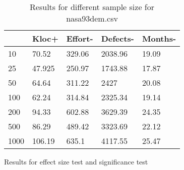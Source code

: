 \begin{table}[]
  \begin{center}
  \begin{tabular}{lllll}
       & Kloc+  & Effort- & Defects- & Months- \\
  \hline
  10   & 70.52  & 329.06  & 2038.96  & 19.09   \\
  25   & 47.925 & 250.97  & 1743.88  & 17.87   \\
  50   & 64.64  & 311.22  & 2427     & 20.08   \\
  100  & 62.24  & 314.84  & 2325.34  & 19.14   \\
  200  & 94.33  & 602.88  & 3629.39  & 24.35   \\
  500  & 86.29  & 489.42  & 3323.69  & 22.12   \\
  1000 & 106.19 & 635.1   & 4117.55  & 25.47  
  \end{tabular}
\end{center}
\caption{Results for different sample size for nasa93dem.csv}
\label{tab:sample_nasa93dem}
\end{table}


\begin{table*}[h]
  \begin{center}
    
  \end{center}
  \caption{Results for effect size test and significance test}
\label{tab:tests}
\end{table*}
